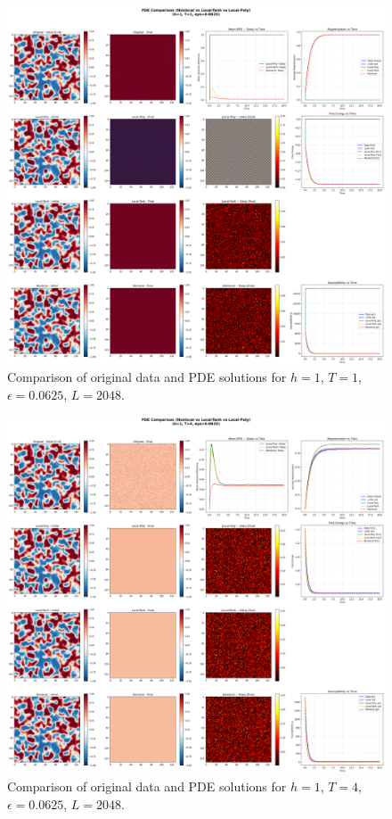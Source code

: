 \documentclass[11pt,a4paper]{article}
\begin{document}
\begin{figure}[!h]
    \centering
    \includegraphics[width=1.0\textwidth]{fig/compare_pde_solvers_L2048_h1_T1_eps0.0625.png}
    \caption{Comparison of original data and PDE solutions for $h=1$, $T=1$, $\epsilon=0.0625$, $L=2048$.}
    \label{fig:pde_comparison_h1_T1_eps0.0625_L2048}
\end{figure}

\begin{figure}[!h]
    \centering
    \includegraphics[width=1.0\textwidth]{fig/compare_pde_solvers_L2048_h1_T4_eps0.0625.png}
    \caption{Comparison of original data and PDE solutions for $h=1$, $T=4$, $\epsilon=0.0625$, $L=2048$.}
    \label{fig:pde_comparison_h1_T4_eps0.0625_L2048}
\end{figure}
\end{document}

